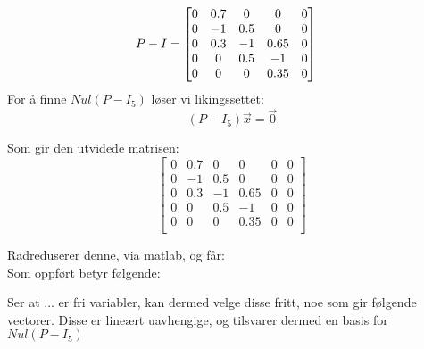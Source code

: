 \documentclass[a4paper, norsk, twoside, 10pt]{article}
\begin{document}
\begin{flushleft}
  \begin{align*}
    P -I &= \begin{bmatrix} 0 & 0.7 & 0 & 0 & 0 \\ 0 & -1 & 0.5 & 0 & 0 \\ 0 & 0.3 & -1 & 0.65 & 0 \\ 0 & 0 & 0.5 & -1 & 0 \\ 0 & 0 & 0 & 0.35 & 0 \\ \end{bmatrix}
  \end{align*}
  For å finne $Nul(P - I_{5})$ løser vi likingssettet:
  \[(P-I_{5}) \vec{x} = \vec{0} \]

  Som gir den utvidede matrisen:
  \[  \begin{bmatrix}
    0 & 0.7 & 0 & 0 & 0 & 0\\
    0 & -1   & 0.5 & 0 & 0 & 0\\
    0 & 0.3 & -1 & 0.65 & 0 & 0\\
    0 & 0   & 0.5 & -1 & 0 & 0\\
    0 & 0 & 0 & 0.35 & 0 & 0\\
  \end{bmatrix}\]

  Radreduserer denne, via matlab, og får:
  \ \\

  Som oppført betyr følgende:

  Ser at ... er fri variabler, kan dermed velge disse fritt, noe som gir følgende vectorer. Disse er lineært uavhengige, og tilsvarer dermed en basis for $Nul(P -I_{5})$

\end{flushleft}
\end{document}
